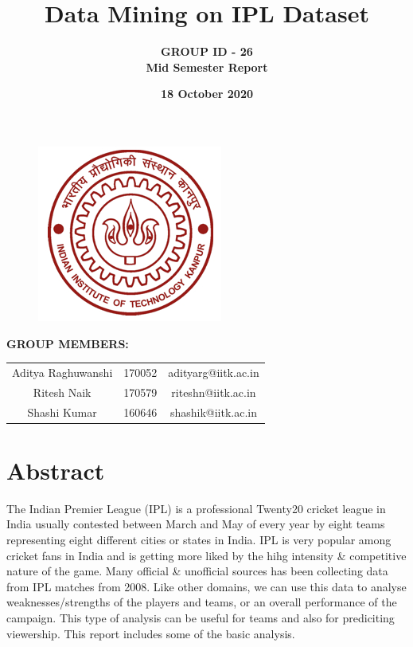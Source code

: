 \documentclass[12pt]{article}
\title{\huge\textbf{Data Mining on IPL Dataset}}
\author{\large\textbf{GROUP ID - 26}\\ \large\textbf{Mid Semester Report}}
\date{\LARGE\textbf{18 October 2020}}
\begin{document}
\maketitle
\vspace{20pt}
\begin{figure}[h]
\centering
\includegraphics[scale=1]{iitk2.jpg}
\end{figure}

\vspace{20pt}

{\Large{\begin{center}
	\textbf{GROUP MEMBERS:}
	\vspace*{7pt}
	
	\begin{tabular}{c c c}
		Aditya Raghuwanshi & 170052 & adityarg@iitk.ac.in \\ 
		Ritesh Naik & 170579 & riteshn@iitk.ac.in \\ 
		Shashi Kumar & 160646 & shashik@iitk.ac.in \\
	\end{tabular}
\end{center}}}
\newpage

\section*{Abstract}
The Indian Premier League (IPL) is a professional Twenty20 cricket league in India usually contested between March and May of every year by eight teams representing eight different cities or states in India. IPL is very popular among cricket fans in India and is getting more liked by the hihg intensity \& competitive nature of the game. Many official \& unofficial sources has been collecting data from IPL matches from 2008. Like other domains, we can use this data to analyse weaknesses/strengths of the players and teams, or an overall performance of the campaign. This type of analysis can be useful for teams and also for prediciting viewership. This report includes some of the basic analysis.
\end{document}
